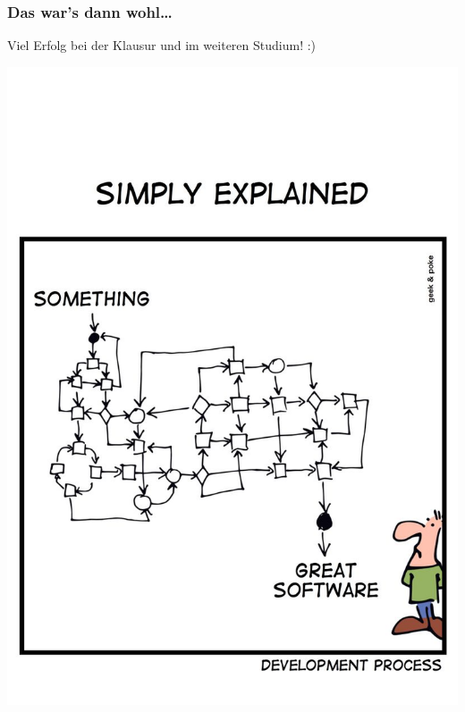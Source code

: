 \documentclass[18pt]{beamer}
\begin{document}
	\begin{frame}
		\frametitle{Das war's dann wohl\dots}
		\centering
		\begin{huge}
			Viel Erfolg bei der Klausur und im weiteren Studium! :)
		\end{huge}
		\linebreak
		\includegraphics[scale=0.6]{./comics/geek_and_poke_development2.jpg}
	\end{frame}
\end{document}
